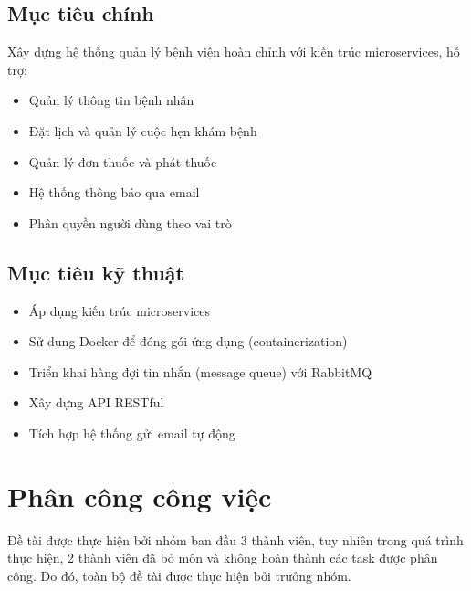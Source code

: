 \documentclass[12pt,a4paper]{report}
\begin{document}
    \subsection{Mục tiêu chính}
    Xây dựng hệ thống quản lý bệnh viện hoàn chỉnh với kiến trúc microservices, hỗ trợ:
    \begin{itemize}
        \item Quản lý thông tin bệnh nhân
        \item Đặt lịch và quản lý cuộc hẹn khám bệnh
        \item Quản lý đơn thuốc và phát thuốc
        \item Hệ thống thông báo qua email
        \item Phân quyền người dùng theo vai trò
    \end{itemize}

    \subsection{Mục tiêu kỹ thuật}
    \begin{itemize}
        \item Áp dụng kiến trúc microservices
        \item Sử dụng Docker để đóng gói ứng dụng (containerization)
        \item Triển khai hàng đợi tin nhắn (message queue) với RabbitMQ
        \item Xây dựng API RESTful
        \item Tích hợp hệ thống gửi email tự động
    \end{itemize}

    \section{Phân công công việc}

    Đề tài được thực hiện bởi nhóm ban đầu 3 thành viên, tuy nhiên trong quá trình thực hiện, 2 thành viên đã bỏ môn và không hoàn thành các task được phân công. Do đó, toàn bộ đề tài được thực hiện bởi trưởng nhóm.
\end{document}
